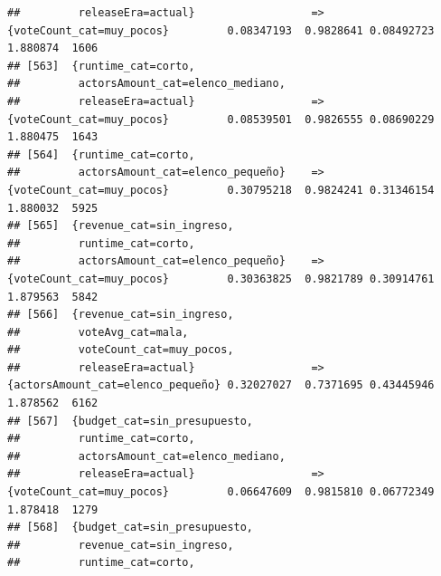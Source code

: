 \documentclass[
]{article}
\begin{document}
\begin{verbatim}
##         releaseEra=actual}                  => {voteCount_cat=muy_pocos}         0.08347193  0.9828641 0.08492723 1.880874  1606
## [563]  {runtime_cat=corto,                                                                                                      
##         actorsAmount_cat=elenco_mediano,                                                                                        
##         releaseEra=actual}                  => {voteCount_cat=muy_pocos}         0.08539501  0.9826555 0.08690229 1.880475  1643
## [564]  {runtime_cat=corto,                                                                                                      
##         actorsAmount_cat=elenco_pequeño}    => {voteCount_cat=muy_pocos}         0.30795218  0.9824241 0.31346154 1.880032  5925
## [565]  {revenue_cat=sin_ingreso,                                                                                                
##         runtime_cat=corto,                                                                                                      
##         actorsAmount_cat=elenco_pequeño}    => {voteCount_cat=muy_pocos}         0.30363825  0.9821789 0.30914761 1.879563  5842
## [566]  {revenue_cat=sin_ingreso,                                                                                                
##         voteAvg_cat=mala,                                                                                                       
##         voteCount_cat=muy_pocos,                                                                                                
##         releaseEra=actual}                  => {actorsAmount_cat=elenco_pequeño} 0.32027027  0.7371695 0.43445946 1.878562  6162
## [567]  {budget_cat=sin_presupuesto,                                                                                             
##         runtime_cat=corto,                                                                                                      
##         actorsAmount_cat=elenco_mediano,                                                                                        
##         releaseEra=actual}                  => {voteCount_cat=muy_pocos}         0.06647609  0.9815810 0.06772349 1.878418  1279
## [568]  {budget_cat=sin_presupuesto,                                                                                             
##         revenue_cat=sin_ingreso,                                                                                                
##         runtime_cat=corto,                                                                                                      

\end{verbatim}
\end{document}
